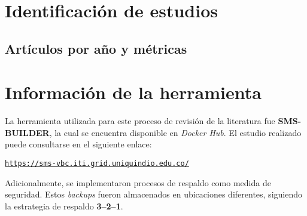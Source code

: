 \section{Identificación de estudios}

\subsection{Artículos por año y métricas}


\section{Información de la herramienta}

\noindent
La herramienta utilizada para este proceso de revisión de la literatura fue \textbf{SMS-BUILDER}, la cual se encuentra disponible en \textit{Docker Hub}. El estudio realizado puede consultarse en el siguiente enlace:

\begin{center}
\href{https://sms-vbc.iti.grid.uniquindio.edu.co/}{\texttt{https://sms-vbc.iti.grid.uniquindio.edu.co/}}
\end{center}

\noindent
Adicionalmente, se implementaron procesos de respaldo como medida de seguridad. Estos \textit{backups} fueron almacenados en ubicaciones diferentes, siguiendo la estrategia de respaldo \textbf{3--2--1}.
